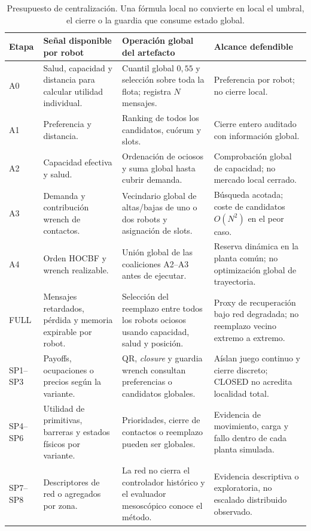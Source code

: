 \begin{table}[H]
\centering
\scriptsize
\begin{tabularx}{\textwidth}{@{}p{}p{}p{}X@{}}
\toprule
Etapa & Señal disponible por robot & Operación global del artefacto & Alcance defendible \\
\midrule
A0 & Salud, capacidad y distancia para calcular utilidad individual. & Cuantil global $0{,}55$ y selección sobre toda la flota; registra $N$ mensajes. & Preferencia por robot; no cierre local. \\
A1 & Preferencia y distancia. & Ranking de todos los candidatos, cuórum y slots. & Cierre entero auditado con información global. \\
A2 & Capacidad efectiva y salud. & Ordenación de ociosos y suma global hasta cubrir demanda. & Comprobación global de capacidad; no mercado local cerrado. \\
A3 & Demanda y contribución wrench de contactos. & Vecindario global de altas/bajas de uno o dos robots y asignación de slots. & Búsqueda acotada; coste de candidatos $O(N^2)$ en el peor caso. \\
A4 & Orden HOCBF y wrench realizable. & Unión global de las coaliciones A2--A3 antes de ejecutar. & Reserva dinámica en la planta común; no optimización global de trayectoria. \\
FULL & Mensajes retardados, pérdida y memoria expirable por robot. & Selección del reemplazo entre todos los robots ociosos usando capacidad, salud y posición. & Proxy de recuperación bajo red degradada; no reemplazo vecino extremo a extremo. \\
SP1--SP3 & Payoffs, ocupaciones o precios según la variante. & QR, \emph{closure} y guardia wrench consultan preferencias o candidatos globales. & Aíslan juego continuo y cierre discreto; CLOSED no acredita localidad total. \\
SP4--SP6 & Utilidad de primitivas, barreras y estados físicos por variante. & Prioridades, cierre de contactos o reemplazo pueden ser globales. & Evidencia de movimiento, carga y fallo dentro de cada planta simulada. \\
SP7--SP8 & Descriptores de red o agregados por zona. & La red no cierra el controlador histórico y el evaluador mesoscópico conoce el método. & Evidencia descriptiva o exploratoria, no escalado distribuido observado. \\
\bottomrule
\end{tabularx}
\caption{Presupuesto de centralización. Una fórmula local no convierte en local el umbral, el cierre o la guardia que consume estado global.}
\label{tab:presupuesto-centralizacion}
\end{table}

